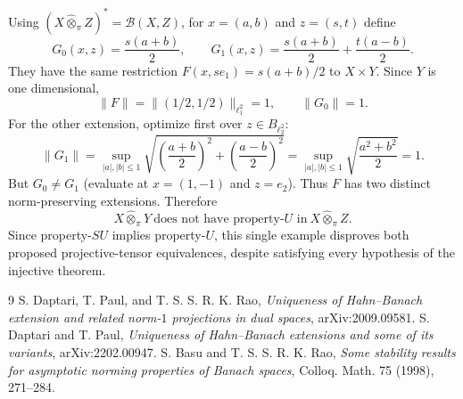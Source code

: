 \documentclass[10pt]{article}
\begin{document}
Using $(X\widehat\otimes_\pi Z)^*=\mathcal B(X,Z)$, for $x=(a,b)$ and $z=(s,t)$ define
\[
 G_0(x,z)=\frac{s(a+b)}2,\qquad
 G_1(x,z)=\frac{s(a+b)}2+\frac{t(a-b)}2.
\]
They have the same restriction
$F(x,se_1)=s(a+b)/2$ to $X\times Y$. Since $Y$ is one dimensional,
\[
 \|F\|=\|(1/2,1/2)\|_{\ell_1^2}=1,
 \qquad \|G_0\|=1.
\]
For the other extension, optimize first over $z\in B_{\ell_2^2}$:
\[
 \|G_1\|
 =\sup_{|a|,|b|\le1}
 \sqrt{\left(\frac{a+b}{2}\right)^2+\left(\frac{a-b}{2}\right)^2}
 =\sup_{|a|,|b|\le1}\sqrt{\frac{a^2+b^2}{2}}=1.
\]
But $G_0\ne G_1$ (evaluate at $x=(1,-1)$ and $z=e_2$). Thus $F$ has two distinct norm-preserving extensions. Therefore
\[
 X\widehat\otimes_\pi Y\ \text{does not have property-$U$ in}\
 X\widehat\otimes_\pi Z.
\]
Since property-$SU$ implies property-$U$, this single example disproves both proposed projective-tensor equivalences, despite satisfying every hypothesis of the injective theorem.

\begin{thebibliography}{9}
S. Daptari, T. Paul, and T. S. S. R. K. Rao,
\emph{Uniqueness of Hahn--Banach extension and related norm-$1$ projections in dual spaces},
arXiv:2009.09581.
S. Daptari and T. Paul,
\emph{Uniqueness of Hahn--Banach extensions and some of its variants},
arXiv:2202.00947.
S. Basu and T. S. S. R. K. Rao,
\emph{Some stability results for asymptotic norming properties of Banach spaces},
Colloq. Math. 75 (1998), 271--284.
\end{thebibliography}
\end{document}
